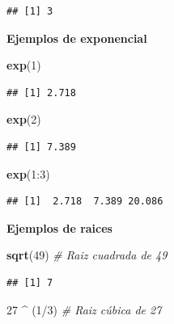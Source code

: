 \documentclass[10pt,]{krantz}
\makeatletter
\newenvironment{Shaded}{\begin{snugshade}}{\end{snugshade}}
\newcommand{\KeywordTok}[1]{\textcolor[rgb]{0.13,0.29,0.53}{\textbf{{#1}}}}
\newcommand{\DecValTok}[1]{\textcolor[rgb]{0.00,0.00,0.81}{{#1}}}
\newcommand{\StringTok}[1]{\textcolor[rgb]{0.31,0.60,0.02}{{#1}}}
\newcommand{\CommentTok}[1]{\textcolor[rgb]{0.56,0.35,0.01}{\textit{{#1}}}}
\newcommand{\NormalTok}[1]{{#1}}
\newenvironment{kframe}{%
\medskip{}
\setlength{\fboxsep}{.8em}
 \def\at@end@of@kframe{}%
 \ifinner\ifhmode%
  \def\at@end@of@kframe{\end{minipage}}%
  \begin{minipage}{\columnwidth}%
 \fi\fi%
 \def\FrameCommand##1{\hskip\@totalleftmargin \hskip-\fboxsep
 \colorbox{shadecolor}{##1}\hskip-\fboxsep
     \hskip-\linewidth \hskip-\@totalleftmargin \hskip\columnwidth}%
 \MakeFramed {\advance\hsize-\width
   \@totalleftmargin\z@ \linewidth\hsize
   \@setminipage}}%
 {\par\unskip\endMakeFramed%
 \at@end@of@kframe}
\renewenvironment{Shaded}{\begin{kframe}}{\end{kframe}}
\makeatother
\begin{document}
\begin{verbatim}
## [1] 3
\end{verbatim}

\textbf{Ejemplos de exponencial}

\begin{Shaded}
\begin{Highlighting}[]
\KeywordTok{exp}\NormalTok{(}\DecValTok{1}\NormalTok{)}
\end{Highlighting}
\end{Shaded}

\begin{verbatim}
## [1] 2.718
\end{verbatim}

\begin{Shaded}
\begin{Highlighting}[]
\KeywordTok{exp}\NormalTok{(}\DecValTok{2}\NormalTok{)}
\end{Highlighting}
\end{Shaded}

\begin{verbatim}
## [1] 7.389
\end{verbatim}

\begin{Shaded}
\begin{Highlighting}[]
\KeywordTok{exp}\NormalTok{(}\DecValTok{1}\NormalTok{:}\DecValTok{3}\NormalTok{)}
\end{Highlighting}
\end{Shaded}

\begin{verbatim}
## [1]  2.718  7.389 20.086
\end{verbatim}

\textbf{Ejemplos de raices}

\begin{Shaded}
\begin{Highlighting}[]
\KeywordTok{sqrt}\NormalTok{(}\DecValTok{49}\NormalTok{)  }\CommentTok{# Raiz cuadrada de 49}
\end{Highlighting}
\end{Shaded}

\begin{verbatim}
## [1] 7
\end{verbatim}

\begin{Shaded}
\begin{Highlighting}[]
\DecValTok{27} \NormalTok{^}\StringTok{ }\NormalTok{(}\DecValTok{1}\NormalTok{/}\DecValTok{3}\NormalTok{)  }\CommentTok{# Raiz cúbica de 27}
\end{Highlighting}
\end{Shaded}
\end{document}
